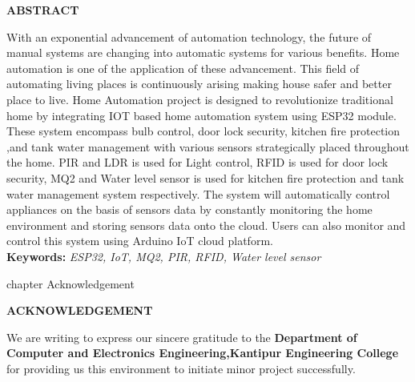 \documentclass[12pt,a4paper]{report}
\begin{document}
	\begin{center}
		\textbf{\fontsize{16}{1.5pt}\selectfont ABSTRACT}
	\end{center}
	
	
	\begin{justify}
		With an exponential advancement of automation technology, the future of manual systems are changing into automatic systems for various benefits. Home automation is one of the application of these advancement. This  field of automating living places is continuously arising making house safer and better place to live. Home Automation project is designed to revolutionize traditional home by integrating IOT based home automation system using ESP32 module. These system encompass bulb control, door lock security, kitchen fire protection ,and tank water management with various sensors strategically placed throughout the home. PIR and LDR is used for Light control, RFID is used for door lock security, MQ2 and Water level sensor is used for kitchen fire protection and tank water management system respectively.  The system will automatically control appliances on the basis of sensors data by constantly monitoring the home environment and storing sensors data onto the cloud.   
		Users can  also monitor and control this system using Arduino IoT cloud platform.\\
		
		
		\textbf{Keywords:} \textit { ESP32, IoT, MQ2, PIR, RFID, Water level sensor }
		
	\end{justify}
	
	
	\pagebreak
	 {chapter} {Acknowledgement}
	\thispagestyle{plain}
	
	\begin{center}
		
		\textbf{\fontsize{16}{1.5pt}\selectfont ACKNOWLEDGEMENT}
	\end{center}
	
	
	\begin{justify}
		We are writing to express our sincere gratitude to the \textbf{ Department of Computer and Electronics Engineering,Kantipur Engineering College}  for providing us this  environment to initiate  minor project successfully. 
	\end{justify}
	
\end{document}
